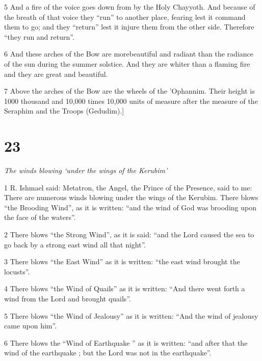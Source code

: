 \par 5 And a fire of the voice goes down from by the Holy Chayyoth. And because of the breath of that voice they “run” to another place, fearing lest it command them to go; and they “return” lest it injure them from the other side. Therefore “they run and return”. 

\par 6 And these arches of the Bow are morebeautiful and radiant than the radiance of the sun during the summer solstice. And they are whiter than a flaming fire and they are great and beautiful. 

\par 7 Above the arches of the Bow are the wheels of the 'Ophannim. Their height is 1000 thousand and 10,000 times 10,000 units of measure after the measure of the Seraphim and the Troops (Gedudim).]

\chapter{23}

\par \textit{The winds blowing ‘under the wings of the Kerubim’}

\par 1 R. Ishmael said: Metatron, the Angel, the Prince of the Presence, said to me: There are numerous winds blowing under the wings of the Kerubim. There blows “the Brooding Wind”, as it is written: “and the wind of God was brooding upon the face of the waters”.

\par 2 There blows “the Strong Wind”, as it is said: “and the Lord caused the sea to go back by a strong east wind all that night”. 

\par 3 There blows “the East Wind” as it is written: “the east wind brought the locusts”. 

\par 4 There blows “the Wind of Quails” as it is written: “And there went forth a wind from the Lord and brought quails”. 

\par 5 There blows “the Wind of Jealousy” as it is written: “And the wind of jealousy came upon him”. 

\par 6 There blows the “Wind of Earthquake ” as it is written: “and after that the wind of the earthquake ; but the Lord was not in the earthquake”. 

